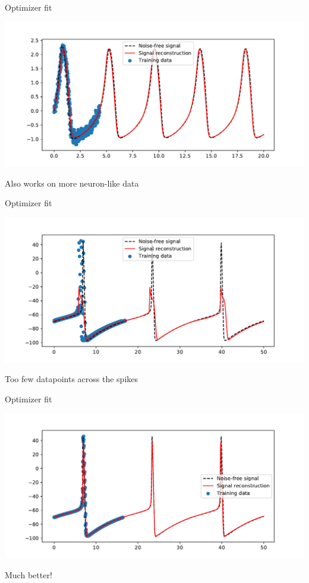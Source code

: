 \documentclass[presentation]{beamer}
\begin{document}
\begin{frame}[label={sec:orgcdb35c6}]{Optimizer fit}
   \begin{center}
\includegraphics[width=.9\linewidth]{./HRFit.pdf}
\end{center}
Also works on more neuron-like data
\end{frame}

\begin{frame}[label={sec:org51f9f19}]{Optimizer fit}
   \begin{center}
\includegraphics[width=.9\linewidth]{./HHFit.pdf}
\end{center}
Too few datapoints across the spikes
\end{frame}

\begin{frame}[label={sec:org91d14c4}]{Optimizer fit}
  \begin{center}
\includegraphics[width=.9\linewidth]{./HHFit2.pdf}
\end{center}
Much better!
\end{frame}
\end{document}
